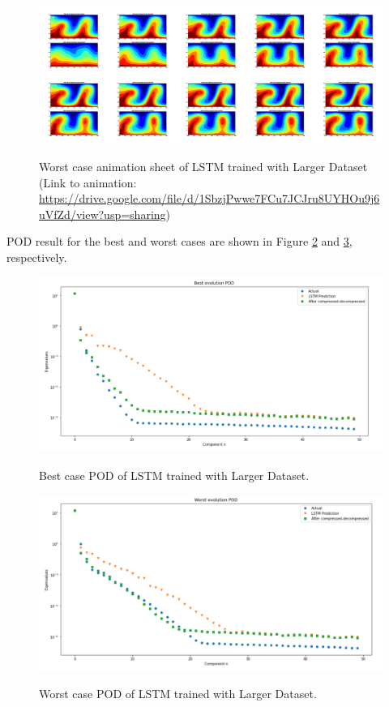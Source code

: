 \begin{figure}[H]
    \centering
    \caption{Worst case animation sheet of LSTM trained with Larger Dataset (Link to animation: 
    \url{https://drive.google.com/file/d/1SbzjPwwe7FCu7JCJru8UYHOu9j6uVfZd/view?usp=sharing})}
    \includegraphics[scale=0.10]{figures/mantle_convection_images/larger_dataset/LSTM_Worst_GIF_sheet.png}
    \label{figure:LSTM_larger_worst_gif}
\end{figure}

POD result for the best and worst cases are shown in Figure \ref{figure:LSTM_larger_best_POD} and \ref{figure:LSTM_larger_worst_POD}, respectively.

\begin{figure}[H]
    \caption{Best case POD of LSTM trained with Larger Dataset.}
    \includegraphics[scale=0.5]{figures/mantle_convection_images/larger_dataset/LSTM_Best_POD.png}
    \label{figure:LSTM_larger_best_POD}
\end{figure}

\begin{figure}[H]
    \caption{Worst case POD of LSTM trained with Larger Dataset.}
    \includegraphics[scale=0.5]{figures/mantle_convection_images/larger_dataset/LSTM_Worst_POD.png}
    \label{figure:LSTM_larger_worst_POD}
\end{figure}

